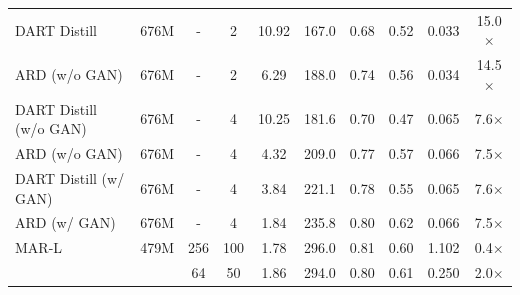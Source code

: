 \documentclass{article}
\theoremstyle{plain}
\theoremstyle{definition}
\theoremstyle{remark}
\begin{document}
\begin{table}[t]
{\begin{tabular}{ l | c | c c | c c | c c | l c}
        DART Distill & 676M & - & 2 & 10.92{\color{blue}{\tiny$\uparrow$8.03}} & 167.0{\color{blue}{\tiny$\downarrow$63.12}} & 0.68{\color{blue}{\tiny$\downarrow$0.12}} & 0.52{\color{blue}{\tiny$\downarrow$0.05}} & 0.033{\color{red}{\tiny$\downarrow$0.461}} & 15.0$\times${\color{red}{\tiny$\uparrow$14.0}} \\
        ARD (w/o GAN) & 676M & - & 2 & 6.29{\color{blue}{\tiny$\uparrow$3.40}} & 188.0{\color{blue}{\tiny$\downarrow$42.15}} & 0.74{\color{blue}{\tiny$\downarrow$0.06}} & 0.56{\color{blue}{\tiny$\downarrow$0.01}} & 0.034{\color{red}{\tiny$\downarrow$0.460}} & 14.5$\times${\color{red}{\tiny$\uparrow$13.5}} \\
        
        DART Distill (w/o GAN) & 676M & - & 4 & 10.25{\color{blue}{\tiny$\uparrow$7.36}} & 181.6{\color{blue}{\tiny$\downarrow$48.62}} & 0.70{\color{blue}{\tiny$\downarrow$0.10}} & 0.47{\color{blue}{\tiny$\downarrow$0.10}} & 0.065{\color{red}{\tiny$\downarrow$0.429}} & 7.6$\times${\color{red}{\tiny$\uparrow$6.6}} \\
        ARD (w/o GAN) & 676M & - & 4 & 4.32{\color{blue}{\tiny$\uparrow$1.43}} & 209.0{\color{blue}{\tiny$\downarrow$21.2}} & 0.77{\color{blue}{\tiny$\downarrow$0.03}} & 0.57 & 0.066{\color{red}{\tiny$\downarrow$0.428}} & 7.5$\times${\color{red}{\tiny$\uparrow$6.5}} \\
        
        DART Distill (w/ GAN) & 676M & - & 4 & 3.84{\color{blue}{\tiny$\uparrow$0.95}} & 221.1{\color{blue}{\tiny$\downarrow$9.1}} & 0.78{\color{blue}{\tiny$\downarrow$0.02}} & 0.55{\color{blue}{\tiny$\downarrow$0.02}} & 0.065{\color{red}{\tiny$\downarrow$0.429}} & 7.6$\times${\color{red}{\tiny$\uparrow$6.6}} \\
        ARD (w/ GAN) & 676M & - & 4 & 1.84{\color{red}{\tiny$\downarrow$1.05}} & 235.8{\color{blue}{\tiny$\downarrow$5.6}} & 0.80 & 0.62{\color{red}{\tiny$\uparrow$0.05}} & 0.066{\color{red}{\tiny$\downarrow$0.428}} & 7.5$\times${\color{red}{\tiny$\uparrow$6.5}} \\

        MAR-L~\cite{mar} & 479M & 256 & 100 & 1.78{\color{red}{\tiny$\downarrow$1.11}} & 296.0{\color{red}{\tiny$\uparrow$65.8}} & 0.81{\color{red}{\tiny$\uparrow$0.01}} & 0.60{\color{red}{\tiny$\uparrow$0.03}} & 1.102{\color{blue}{\tiny$\uparrow$0.608}} & 0.4$\times${\color{blue}{\tiny$\downarrow$0.6}} \\
        & & 64 & 50 & 1.86{\color{red}{\tiny$\downarrow$1.03}} & 294.0{\color{red}{\tiny$\uparrow$63.8}} & 0.80 & 0.61{\color{red}{\tiny$\uparrow$0.04}} & 0.250{\color{red}{\tiny$\downarrow$0.244}} & 2.0$\times${\color{red}{\tiny$\uparrow$1.0}} \\
        

\end{tabular}}
\end{table}
\end{document}
